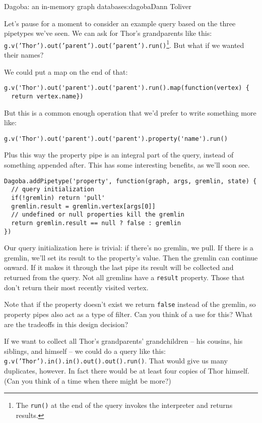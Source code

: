 \begin{aosachapter}{Dagoba: an in-memory graph database}{s:dagoba}{Dann Toliver}
\label{property}

Let's pause for a moment to consider an example query based on the three
pipetypes we've seen. We can ask for Thor's grandparents like this:
\texttt{g.v('Thor').out('parent').out('parent').run()}\footnote{The
  \texttt{run()} at the end of the query invokes the interpreter and
  returns results.}. But what if we wanted their names?

We could put a map on the end of that:

\begin{verbatim}
g.v('Thor').out('parent').out('parent').run().map(function(vertex) {
  return vertex.name})
\end{verbatim}

But this is a common enough operation that we'd prefer to write
something more like:

\begin{verbatim}
g.v('Thor').out('parent').out('parent').property('name').run()
\end{verbatim}

Plus this way the property pipe is an integral part of the query,
instead of something appended after. This has some interesting benefits,
as we'll soon see.

\begin{verbatim}
Dagoba.addPipetype('property', function(graph, args, gremlin, state) {
  // query initialization
  if(!gremlin) return 'pull'                            
  gremlin.result = gremlin.vertex[args[0]]
  // undefined or null properties kill the gremlin
  return gremlin.result == null ? false : gremlin       
})
\end{verbatim}

Our query initialization here is trivial: if there's no gremlin, we
pull. If there is a gremlin, we'll set its result to the property's
value. Then the gremlin can continue onward. If it makes it through the
last pipe its result will be collected and returned from the query. Not
all gremlins have a \texttt{result} property. Those that don't return
their most recently visited vertex.

Note that if the property doesn't exist we return \texttt{false} instead
of the gremlin, so property pipes also act as a type of filter. Can you
think of a use for this? What are the tradeoffs in this design decision?

\label{unique}

If we want to collect all Thor's grandparents' grandchildren -- his
cousins, his siblings, and himself -- we could do a query like this:
\texttt{g.v('Thor').in().in().out().out().run()}. That would give us
many duplicates, however. In fact there would be at least four copies of
Thor himself. (Can you think of a time when there might be more?)


\end{aosachapter}
